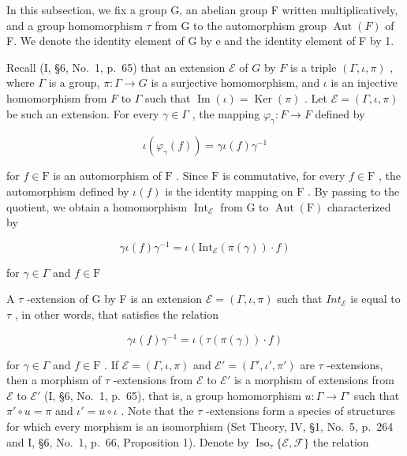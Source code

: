 In this subsection, we fix a group G, an abelian group F written multiplicatively, and a group homomorphism \(\tau\) from G to the automorphism group \(\operatorname{Aut}(F)\) of F. We denote the identity element of G by e and the identity element of F by 1.

Recall (I, §6, No.~1, p.~65) that an extension \(\mathcal{E}\) of \(G\) by \(F\) is a triple \((\Gamma, \iota, \pi)\) , where \(\Gamma\) is a group, \(\pi: \Gamma \to G\) is a surjective homomorphism, and \(\iota\) is an injective homomorphism from \(F\) to \(\Gamma\) such that \(\operatorname{Im}(\iota) = \operatorname{Ker}(\pi)\) . Let \(\mathcal{E} = (\Gamma, \iota, \pi)\) be such an extension. For every \(\gamma \in \Gamma\) , the mapping \(\varphi_{\gamma}: F \to F\) defined by

\[
\iota (\varphi_ {\gamma} (f)) = \gamma \iota (f) \gamma^ {- 1}
\]

for \(f \in \mathrm{F}\) is an automorphism of \(\mathrm{F}\) . Since \(\mathrm{F}\) is commutative, for every \(f \in \mathrm{F}\) , the automorphism defined by \(\iota(f)\) is the identity mapping on \(\mathrm{F}\) . By passing to the quotient, we obtain a homomorphism \(\operatorname{Int}_{\mathcal{E}}\) from \(\mathrm{G}\) to \(\operatorname{Aut}(\mathrm{F})\) characterized by

\[
\gamma \iota (f) \gamma^ {- 1} = \iota (\mathrm{Int} _ {\mathcal {E}} (\pi (\gamma)) \cdot f)
\]

for \(\gamma \in \Gamma\) and \(f\in \mathrm{F}\)

A \(\tau\) -extension of G by F is an extension \(\mathcal{E} = (\Gamma, \iota, \pi)\) such that \(Int_{\mathcal{E}}\) is equal to \(\tau\) , in other words, that satisfies the relation

\[
\gamma \iota (f) \gamma^ {- 1} = \iota (\tau (\pi (\gamma)) \cdot f)\tag{1}
\]

for \(\gamma \in \Gamma\) and \(f \in \mathrm{F}\) . If \(\mathcal{E} = (\Gamma, \iota, \pi)\) and \(\mathcal{E}' = (\Gamma', \iota', \pi')\) are \(\tau\) -extensions, then a morphism of \(\tau\) -extensions from \(\mathcal{E}\) to \(\mathcal{E}'\) is a morphism of extensions from \(\mathcal{E}\) to \(\mathcal{E}'\) (I, §6, No.~1, p.~65), that is, a group homomorphism \(u: \Gamma \to \Gamma'\) such that \(\pi' \circ u = \pi\) and \(\iota' = u \circ \iota\) . Note that the \(\tau\) -extensions form a species of structures for which every morphism is an isomorphism (Set Theory, IV, §1, No.~5, p.~264 and I, §6, No.~1, p.~66, Proposition 1). Denote by \(\operatorname{Iso}_{\tau} \{\mathcal{E}, \mathcal{F}\}\) the relation

